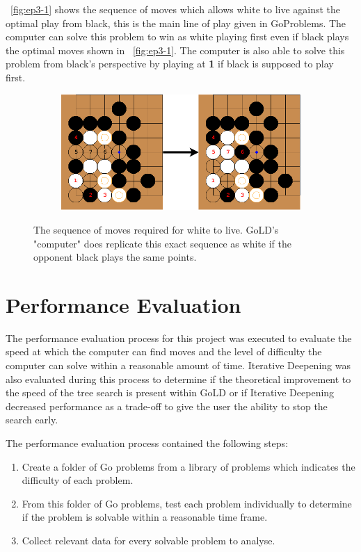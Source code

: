 \documentclass{l4proj}
\newcommand{\bo}[1]{\textbf{#1}}
\begin{document}
~\autoref{fig:ep3-1} shows the sequence of moves which allows white to live against the optimal play from black, this is the main line of play given in GoProblems. The computer can solve this problem to win as white playing first even if black plays the optimal moves shown in ~\autoref{fig:ep3-1}. The computer is also able to solve this problem from black's perspective by playing at \bo{1} if black is supposed to play first.





\begin{figure}[!ht]
\centering
\begin{subfigure}[b]{0.70\textwidth}
\centering
\includegraphics[width=\textwidth]{ep3/ep3-1.png}
\end{subfigure}
\caption{The sequence of moves required for white to live. GoLD's "computer" does replicate this exact sequence as white if the opponent black plays the same points.}
\label{fig:ep3-1}
\end{figure}

\section{Performance Evaluation}

The performance evaluation process for this project was executed to evaluate the speed at which the computer can find moves and the level of difficulty the computer can solve within a reasonable amount of time. Iterative Deepening was also evaluated during this process to determine if the theoretical improvement to the speed of the tree search is present within GoLD or if Iterative Deepening decreased performance as a trade-off to give the user the ability to stop the search early.

The performance evaluation process contained the following steps:
\begin{enumerate}
\item Create a folder of Go problems from a library of problems which indicates the difficulty of each problem.
\item From this folder of Go problems, test each problem individually to determine if the problem is solvable within a reasonable time frame.
\item  Collect relevant data for every solvable problem to analyse.
\end{enumerate}
\end{document}
